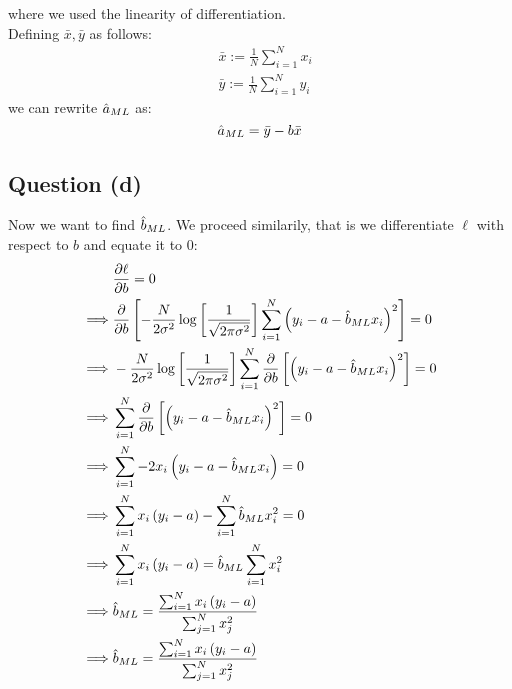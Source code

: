 \documentclass[12pt]{article}
\begin{document}
where we used the linearity of differentiation. \\
Defining \(\bar{x}, \bar{y}\) as follows:
\begin{align*}
     & \bar{x} := \frac{1}{N} \sum_{i=1}^N x_i \\
     & \bar{y} := \frac{1}{N} \sum_{i=1}^N y_i
\end{align*}
we can rewrite \(\hat a_{ML}\) as:
\begin{equation}
    \label{eqn: preliminary aml}
    \hat a_{ML} = \bar{y} - b \bar{x}
\end{equation}
\subsection{Question (d)}
Now we want to find \(\hat b_{ML}\). We proceed similarily, that is we differentiate \(\ell\) with respect to \(b\) and equate it to 0:
\begin{align*}
             &
    \frac{\partial \ell}{\partial b} = 0                                                                                                                                     \\
    \implies &
    \frac{\partial}{\partial b} \left[-\frac{N}{2 \sigma^2}\log \left[\frac{1}{\sqrt{2 \pi \sigma^{2}}}\right] \sum_{i=1}^N \left(y_i - a - \hat b_{ML} x_i \right)^{2}\right] = 0  \\
    \implies &
    -\frac{N}{2 \sigma^2}\log \left[\frac{1}{\sqrt{2 \pi \sigma^{2}}}\right] \sum_{i=1}^N \frac{\partial}{\partial b} \left[ \left(y_i - a - \hat b_{ML} x_i \right)^{2}\right] = 0 \\
    \implies &
    \sum_{i=1}^N \frac{\partial}{\partial b} \left[ \left(y_i - a - \hat b_{ML} x_i \right)^{2}\right] = 0                                                                          \\
    \implies &
    \sum_{i=1}^N -2x_i \left(y_i - a - \hat b_{ML} x_i \right) = 0                                                                                                                  \\
    \implies &
    \sum_{i=1}^N x_i \left(y_i - a \right) - \sum_{i=1}^N \hat b_{ML} x_i^2 = 0                                                                                                     \\
    \implies &
    \sum_{i=1}^N x_i \left(y_i - a \right) = \hat b_{ML} \sum_{i=1}^N x_i^2                                                                                                         \\
    \implies &
    \hat b_{ML} = \frac{\sum_{i=1}^N x_i \left(y_i - a \right)}{\sum_{j=1}^N x_j^2}                                                                                                 \\
    \implies &
    \hat b_{ML} = \frac{\sum_{i=1}^N x_i \left(y_i - a \right)}{\sum_{j=1}^N x_j^2}                                                                                                 \\
\end{align*}
\end{document}
